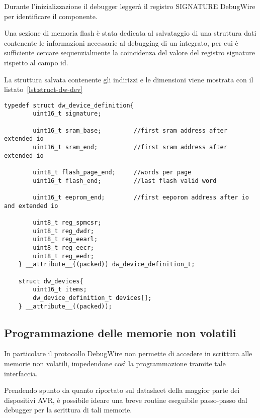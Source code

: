 Durante l'inizializzazione il debugger leggerà il registro SIGNATURE DebugWire per identificare il componente.

Una sezione di memoria flash è stata dedicata al salvataggio di una struttura dati contenente le informazioni necessarie al debugging di un integrato, per cui è sufficiente cercare sequenzialmente la coincidenza del valore del registro signature rispetto al campo id.

La struttura salvata contenente gli indirizzi e le dimensioni viene mostrata con il listato~\ref{lst:struct-dw-dev}

\noindent\begin{minipage}{\textwidth}
    \begin{lstlisting}[style=C, caption={Strutture utilizzate nel codice finale per il salvataggio e la ricerca dei parametri associati al target connesso}, label=lst:struct-dw-dev]
    typedef struct dw_device_definition{
        uint16_t signature;

        uint16_t sram_base;         //first sram address after extended io
        uint16_t sram_end;          //first sram address after extended io

        uint8_t flash_page_end;     //words per page
        uint16_t flash_end;         //last flash valid word

        uint16_t eeprom_end;        //first eeporom address after io and extended io

        uint8_t reg_spmcsr;
        uint8_t reg_dwdr;
        uint8_t reg_eearl;
        uint8_t reg_eecr;
        uint8_t reg_eedr;
    } __attribute__((packed)) dw_device_definition_t;

    struct dw_devices{
        uint16_t items;
        dw_device_definition_t devices[];
    } __attribute__((packed));
    \end{lstlisting}
\end{minipage}

\subsection{Programmazione delle memorie non volatili}

In particolare il protocollo DebugWire non permette di accedere in scrittura alle memorie non volatili, impedendone così la programmazione tramite tale interfaccia.

Prendendo spunto da quanto riportato sul datasheet della maggior parte dei dispositivi AVR\cite[34]{avr:m328p}\cite[sec 26.2.5]{avr:m328p}, è possibile ideare una breve routine eseguibile passo-passo dal debugger per la scrittura di tali memorie.

